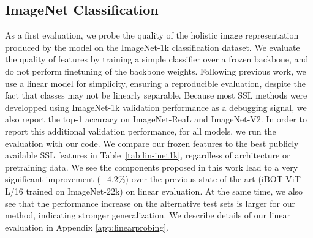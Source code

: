 \subsection{ImageNet Classification}
\label{sec:imagenet}
As a first evaluation, we probe the quality of the holistic image representation produced by the model on the ImageNet-1k classification dataset.
We evaluate the quality of features by training a simple classifier over a frozen backbone, and do not perform finetuning of the backbone weights.
Following previous work, we use a linear model for simplicity, ensuring a reproducible evaluation, despite the fact that classes may not be linearly separable.
Because most SSL methods were developped using ImageNet-1k validation performance as a debugging signal, we also report the top-1 accuracy on ImageNet-ReaL and ImageNet-V2.
In order to report this additional validation performance, for all models, we run the evaluation with our code.
We compare our frozen features to the best publicly available SSL features in Table~\ref{tab:lin-inet1k}, regardless of architecture or pretraining data. 
We see the components proposed in this work lead to a very significant improvement ($+4.2\%$) over the previous state of the art (iBOT ViT-L/16 trained on ImageNet-22k) on linear evaluation.
At the same time, we also see that the performance increase on the alternative test sets is larger for our method, indicating stronger generalization. We describe details of our linear evaluation in Appendix \ref{app:linearprobing}.

